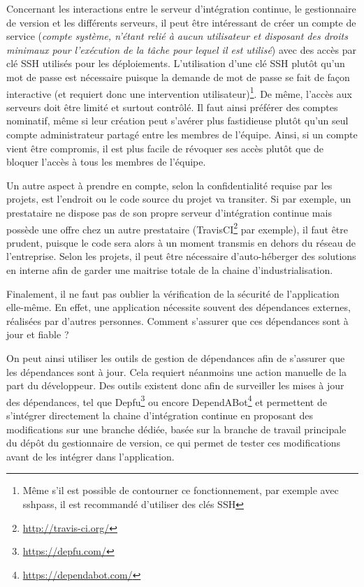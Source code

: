 Concernant les interactions entre le serveur d'intégration continue, le gestionnaire de version et les différents serveurs, il peut être intéressant de créer un compte de service (\emph{compte système, n'étant relié à aucun utilisateur et disposant des droits minimaux pour l'exécution de la tâche pour lequel il est utilisé}) avec des accès par clé \gls{SSH} utilisés pour les déploiements. L'utilisation d'une clé \gls{SSH} plutôt qu'un mot de passe est nécessaire puisque la demande de mot de passe se fait de façon interactive (et requiert donc une intervention utilisateur)\footnote{Même s'il est possible de contourner ce fonctionnement, par exemple avec sshpass, il est recommandé d'utiliser des clés \gls{SSH}}. De même, l'accès aux serveurs doit être limité et surtout contrôlé. Il faut ainsi préférer des comptes nominatif, même si leur création peut s'avérer plus fastidieuse plutôt qu'un seul compte administrateur partagé entre les membres de l'équipe. Ainsi, si un compte vient être compromis, il est plus facile de révoquer ses accès plutôt que de bloquer l'accès à tous les membres de l'équipe.

Un autre aspect à prendre en compte, selon la confidentialité requise par les projets, est l'endroit ou le code source du projet va transiter. Si par exemple, un prestataire ne dispose pas de son propre serveur d'intégration continue mais possède une offre chez un autre prestataire (TravisCI\footnote{\url{http://travis-ci.org/}} par exemple), il faut être prudent, puisque le code sera alors à un moment transmis en dehors du réseau de l'entreprise. Selon les projets, il peut être nécessaire d'auto-héberger des solutions en interne afin de garder une maitrise totale de la chaine d'industrialisation.

Finalement, il ne faut pas oublier la vérification de la sécurité de l'application elle-même. En effet, une application nécessite souvent des dépendances externes, réalisées par d'autres personnes. Comment s'assurer que ces dépendances sont à jour et fiable ? 

On peut ainsi utiliser les outils de gestion de dépendances afin de s'assurer que les dépendances sont à jour. Cela requiert néanmoins une action manuelle de la part du développeur. Des outils existent donc afin de surveiller les mises à jour des dépendances, tel que Depfu\footnote{\url{https://depfu.com/}} ou encore DependABot\footnote{\url{https://dependabot.com/}} et permettent de s'intégrer directement la chaine d'intégration continue en proposant des modifications sur une branche dédiée, basée sur la branche de travail principale du dépôt du gestionnaire de version, ce qui permet de tester ces modifications avant de les intégrer dans l'application.

